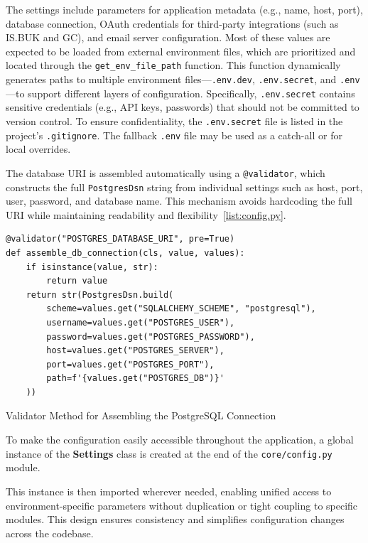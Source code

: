 The settings include parameters for application metadata (e.g., name, host, port), database connection, OAuth credentials for third-party integrations (such as IS.BUK and GC), and email server configuration. Most of these values are expected to be loaded from external environment files, which are prioritized and located through the \texttt{get\_env\_file\_path} function. This function 
dynamically generates paths to multiple environment files—\texttt{.env.dev}, \texttt{.env.secret}, and \texttt{.env}—to support different layers of configuration. Specifically, \texttt{.env.secret} contains sensitive credentials (e.g., API keys, passwords) that should not be committed to version control. To ensure confidentiality, the \texttt{.env.secret} file is listed in the project’s \texttt{.gitignore}. The fallback \texttt{.env} file may be used as a catch-all or for local overrides.

The database URI is assembled automatically using a \texttt{@validator}, which constructs the full \texttt{PostgresDsn} string from individual settings such as host, port, user, password, and database name. This mechanism avoids hardcoding the full URI while maintaining readability and flexibility~\ref{list:config.py}.

\begin{listing}
  \begin{verbatim}
@validator("POSTGRES_DATABASE_URI", pre=True)
def assemble_db_connection(cls, value, values):
    if isinstance(value, str):
        return value
    return str(PostgresDsn.build(
        scheme=values.get("SQLALCHEMY_SCHEME", "postgresql"),
        username=values.get("POSTGRES_USER"),
        password=values.get("POSTGRES_PASSWORD"),
        host=values.get("POSTGRES_SERVER"),
        port=values.get("POSTGRES_PORT"),
        path=f'{values.get("POSTGRES_DB")}'
    ))
\end{verbatim}
\caption{Validator Method for Assembling the PostgreSQL Connection}
\label{list:config.py}
\end{listing}

To make the configuration easily accessible throughout the application, a global instance of the \textbf{Settings} class is created at the end of the \texttt{core/config.py} module.

This instance is then imported wherever needed, enabling unified access to environment-specific parameters without duplication or tight coupling to specific modules. This design ensures consistency and simplifies configuration changes across the codebase.


